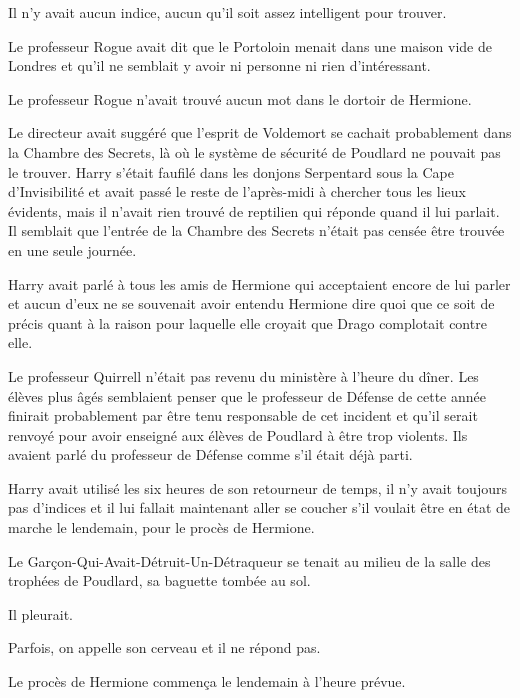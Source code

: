 Il n'y avait aucun indice, aucun qu'il soit assez intelligent pour trouver.

Le professeur Rogue avait dit que le Portoloin menait dans une maison vide de Londres et qu'il ne semblait y avoir ni personne ni rien d'intéressant.

Le professeur Rogue n'avait trouvé aucun mot dans le dortoir de Hermione.

Le directeur avait suggéré que l'esprit de Voldemort se cachait probablement dans la Chambre des Secrets, là où le système de sécurité de Poudlard ne pouvait pas le trouver.
Harry s'était faufilé dans les donjons Serpentard sous la Cape d'Invisibilité et avait passé le reste de l'après-midi à chercher tous les lieux évidents, mais il n'avait rien trouvé de reptilien qui réponde quand il lui parlait.
Il semblait que l'entrée de la Chambre des Secrets n'était pas censée être trouvée en une seule journée.

Harry avait parlé à tous les amis de Hermione qui acceptaient encore de lui parler et aucun d'eux ne se souvenait avoir entendu Hermione dire quoi que ce soit de précis quant à la raison pour laquelle elle croyait que Drago complotait contre elle.

Le professeur Quirrell n'était pas revenu du ministère à l'heure du dîner.
Les élèves plus âgés semblaient penser que le professeur de Défense de cette année finirait probablement par être tenu responsable de cet incident et qu'il serait renvoyé pour avoir enseigné aux élèves de Poudlard à être trop violents.
Ils avaient parlé du professeur de Défense comme s'il était déjà parti.

Harry avait utilisé les six heures de son retourneur de temps, il n'y avait toujours pas d'indices et il lui fallait maintenant aller se coucher s'il voulait être en état de marche le lendemain, pour le procès de Hermione.

Le Garçon-Qui-Avait-Détruit-Un-Détraqueur se tenait au milieu de la salle des trophées de Poudlard, sa baguette tombée au sol.

Il pleurait.

Parfois, on appelle son cerveau et il ne répond pas.

Le procès de Hermione commença le lendemain à l'heure prévue.
